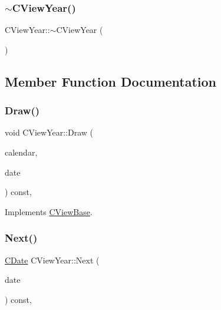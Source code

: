 \subsubsection{\texorpdfstring{$\sim$\+C\+View\+Year()}{~CViewYear()}}
{\footnotesize\ttfamily C\+View\+Year\+::$\sim$\+C\+View\+Year (\begin{DoxyParamCaption}{ }\end{DoxyParamCaption})\hspace{0.3cm}{\ttfamily [default]}}



\subsection{Member Function Documentation}
\mbox{\label{class_c_view_year_ad8f7c1b95dc1e46ae842f9e36aff6669}} 
\subsubsection{\texorpdfstring{Draw()}{Draw()}}
{\footnotesize\ttfamily void C\+View\+Year\+::\+Draw (\begin{DoxyParamCaption}\item[{const \mbox{\hyperlink{class_c_calendar}{C\+Calendar}} \&}]{calendar,  }\item[{const \mbox{\hyperlink{class_c_date}{C\+Date}} \&}]{date }\end{DoxyParamCaption}) const\hspace{0.3cm}{\ttfamily [override]}, {\ttfamily [virtual]}}



Implements \mbox{\hyperlink{class_c_view_base_a10a44a3680cc7ba6cd42ed99d128ed22}{C\+View\+Base}}.

\mbox{\label{class_c_view_year_a93c8851786eac9fffe55cf006965a505}} 
\subsubsection{\texorpdfstring{Next()}{Next()}}
{\footnotesize\ttfamily \mbox{\hyperlink{class_c_date}{C\+Date}} C\+View\+Year\+::\+Next (\begin{DoxyParamCaption}\item[{const \mbox{\hyperlink{class_c_date}{C\+Date}} \&}]{date }\end{DoxyParamCaption}) const\hspace{0.3cm}{\ttfamily [override]}, {\ttfamily [virtual]}}




